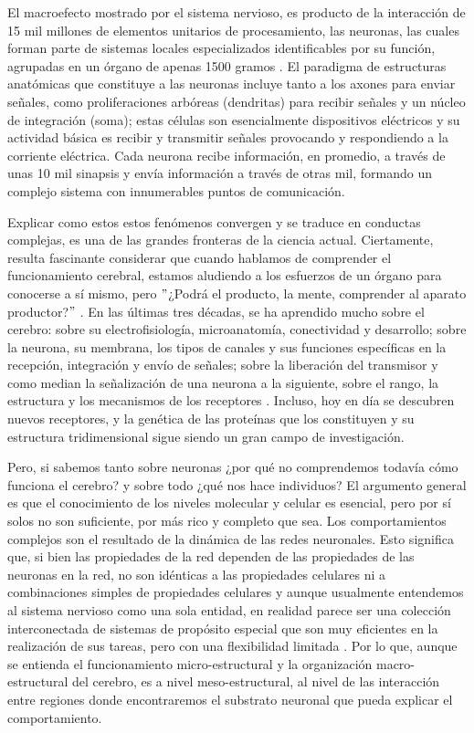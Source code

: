 \documentclass[11pt,letterpaper]{article}
\numberwithin{equation}{subsection}
\numberwithin{table}{subsection}
\begin{document}
\bigskip
\noindent El macroefecto mostrado por el sistema nervioso, es producto de la interacción de 15 mil millones de elementos unitarios de procesamiento, las neuronas, las cuales forman parte de sistemas locales especializados identificables por su función, agrupadas en un órgano de apenas 1500 gramos \cite{Kandel2000}. El paradigma de estructuras anatómicas que constituye a las neuronas incluye tanto a los axones para enviar señales, como proliferaciones arbóreas (dendritas) para recibir señales y un núcleo de integración (soma); estas células son esencialmente dispositivos eléctricos y su actividad básica es recibir y transmitir señales provocando y respondiendo a la corriente eléctrica. Cada neurona recibe información, en promedio, a través de unas 10 mil sinapsis y envía información a través de otras mil, formando un complejo sistema con innumerables puntos de comunicación. %


\bigskip
\noindent Explicar como estos estos fenómenos convergen y se traduce en conductas complejas, es una de las grandes fronteras de la ciencia actual. Ciertamente, resulta fascinante considerar que cuando hablamos de comprender el funcionamiento cerebral, estamos aludiendo a los esfuerzos de un órgano para conocerse a sí mismo, pero $"$¿Podrá el producto, la mente, comprender al aparato productor?$"$ \cite{arechiga2014universo}. En las últimas tres décadas, se ha aprendido mucho sobre el cerebro: sobre su electrofisiología, microanatomía, conectividad y desarrollo; sobre la neurona, su membrana, los tipos de canales y sus funciones específicas en la recepción, integración y envío de señales; sobre la liberación del transmisor y como median la señalización de una neurona a la siguiente, sobre el rango, la estructura y los mecanismos de los receptores \cite{Levitan1991, Chappell2020}. Incluso, hoy en día se descubren nuevos receptores, y la genética de las proteínas que los constituyen y su estructura tridimensional sigue siendo un gran campo de investigación.

\bigskip
\noindent Pero, si sabemos tanto sobre neuronas ¿por qué no comprendemos todavía cómo funciona el cerebro? y sobre todo ¿qué nos hace individuos? El argumento general es que el conocimiento de los niveles molecular y celular es esencial, pero por sí solos no son suficiente, por más rico y completo que sea. Los comportamientos complejos son el resultado de la dinámica de las redes neuronales. Esto significa que, si bien las propiedades de la red dependen de las propiedades de las neuronas en la red, no son idénticas a las propiedades celulares ni a combinaciones simples de propiedades celulares \cite{Bailek1991} y aunque usualmente entendemos al sistema nervioso como una sola entidad, en realidad parece ser una colección interconectada de sistemas de propósito especial que son muy eficientes en la realización de sus tareas, pero con una flexibilidad limitada \cite{Churchland1994}. Por lo que, aunque se entienda el funcionamiento micro-estructural y la organización macro-estructural del cerebro, es a nivel meso-estructural, al nivel de las interacción entre regiones donde encontraremos el substrato neuronal que pueda explicar el comportamiento.  
\end{document}

